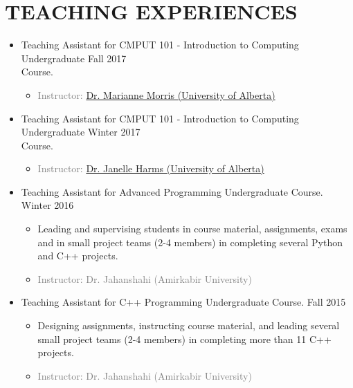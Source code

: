\documentclass[10pt,a4paper,sans]{moderncv} %
\begin{document}
\section{TEACHING EXPERIENCES}

\begin{itemize}
	\item {} Teaching Assistant for CMPUT 101 - Introduction to Computing Undergraduate  \hfill Fall 2017
	\\ Course.
	\begin{itemize} 
		\item\textcolor{gray}{Instructor: \href{https://webdocs.cs.ualberta.ca/~marianne/}{Dr. Marianne Morris (University of Alberta)}}
	\end{itemize}

	\item {} Teaching Assistant for CMPUT 101 - Introduction to Computing Undergraduate  \hfill Winter 2017
	\\ Course.
	\begin{itemize} 
		\item\textcolor{gray}{Instructor: \href{https://webdocs.cs.ualberta.ca/~harms/}{Dr. Janelle Harms (University of Alberta)}}
	\end{itemize}
		
	\item {} Teaching Assistant for Advanced Programming Undergraduate Course. \hfill Winter 2016
	\begin{itemize} 
		\item Leading and supervising students in course material, assignments, exams and in small project teams (2-4 members) in completing several Python and C++ projects.
		\item\textcolor{gray}{Instructor: Dr. Jahanshahi (Amirkabir University)}
	\end{itemize}
	
	\item {} Teaching Assistant for C++ Programming Undergraduate Course. \hfill Fall 2015
	\begin{itemize} 
		\item Designing assignments, instructing course material, and leading several small project teams (2-4 members) in completing more than 11 C++ projects.
		\item \textcolor{gray}{Instructor: Dr. Jahanshahi (Amirkabir University)}
	\end{itemize}
	

\end{itemize}
\end{document}
